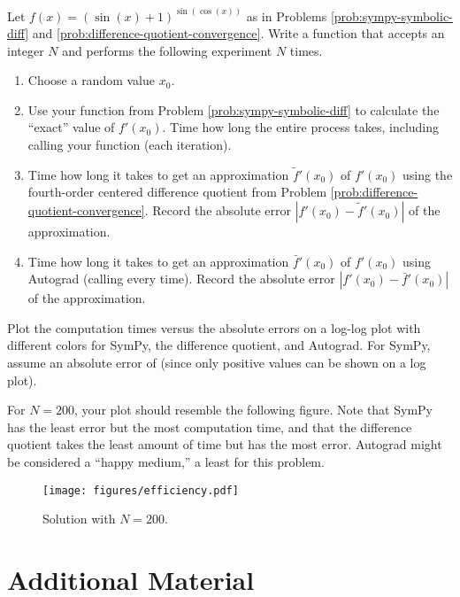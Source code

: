 \begin{problem} %
Let $f(x) = (\sin(x) + 1)^{\sin(\cos(x))}$ as in Problems \ref{prob:sympy-symbolic-diff} and \ref{prob:difference-quotient-convergence}.
Write a function that accepts an integer $N$ and performs the following experiment $N$ times.
\begin{enumerate}
\item Choose a random value $x_0$.
\item Use your function from Problem \ref{prob:sympy-symbolic-diff} to calculate the ``exact'' value of $f'(x_0)$.
Time how long the entire process takes, including calling your function (each iteration).
\item Time how long it takes to get an approximation $\tilde{f}'(x_0)$ of $f'(x_0)$ using the fourth-order centered difference quotient from Problem \ref{prob:difference-quotient-convergence}.
Record the absolute error $|f'(x_0) - \tilde{f}'(x_0)|$ of the approximation.
\item Time how long it takes to get an approximation $\bar{f}'(x_0)$ of $f'(x_0)$ using Autograd (calling  every time).
Record the absolute error $|f'(x_0) - \bar{f}'(x_0)|$ of the approximation.
\end{enumerate}

Plot the computation times versus the absolute errors on a log-log plot with different colors for SymPy, the difference quotient, and Autograd.
For SymPy, assume an absolute error of  (since only positive values can be shown on a log plot).

For $N=200$, your plot should resemble the following figure.
Note that SymPy has the least error but the most computation time, and that the difference quotient takes the least amount of time but has the most error.
Autograd might be considered a ``happy medium,'' a least for this problem.

\begin{figure}[H]
    \texttt{[image: figures/efficiency.pdf]}
    \caption{Solution with $N = 200$.}
\end{figure}
\end{problem}

\newpage

\section*{Additional Material} %

